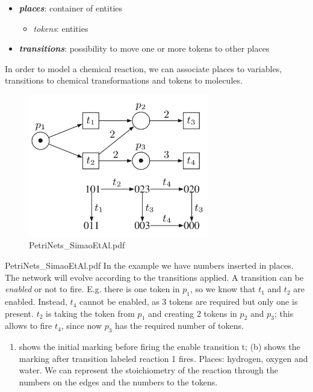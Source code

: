   \begin{itemize}
    \item \textbf{\emph{places}}: container of entities
      \begin{itemize}
        \item \emph{tokens}: entities
      \end{itemize}
    \item \textbf{\emph{transitions}}: possibility to move one or more tokens to other places
  \end{itemize}

  In order to model a chemical reaction, we can associate places to variables, transitions to chemical transformations and tokens to molecules.

  \begin{figure}[h!]
    \centering
    \includegraphics[width=0.7\textwidth]{petri_nets.png}
    \caption{PetriNets\_SimaoEtAl.pdf}
  \end{figure}

  PetriNets\_SimaoEtAl.pdf In the example we have numbers inserted in places.
  The network will evolve according to the transitions applied.
  A transition can be \emph{enabled} or not to fire.
  E.g. there is one token in \(p_1\), so we know that \(t_1\) and \(t_2\) are enabled.
  Instead, \(t_4\) cannot be enabled, as 3 tokens are required but only one is present.
  \(t_2\) is taking the token from \(p_1\) and creating 2 tokens in \(p_2\) and \(p_3\); this allows to fire \(t_4\), since now \(p_3\) has the required number of tokens.

  \begin{enumerate}
    \def\labelenumi{(\alph{enumi})}
    \item shows the initial marking before firing the enable transition t; (b) shows the marking after transition labeled reaction 1 fires.
      Places: hydrogen, oxygen and water.
      We can represent the stoichiometry of the reaction through the numbers on the edges and the numbers to the tokens.
    \end{enumerate}

